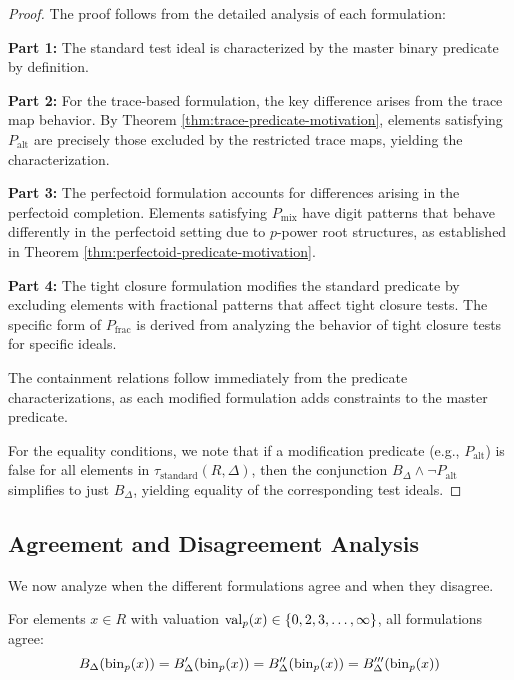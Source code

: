 \begin{proof}
The proof follows from the detailed analysis of each formulation:

\textbf{Part 1:} The standard test ideal is characterized by the master binary predicate by definition.

\textbf{Part 2:} For the trace-based formulation, the key difference arises from the trace map behavior. By Theorem \ref{thm:trace-predicate-motivation}, elements satisfying $P_{\text{alt}}$ are precisely those excluded by the restricted trace maps, yielding the characterization.

\textbf{Part 3:} The perfectoid formulation accounts for differences arising in the perfectoid completion. Elements satisfying $P_{\text{mix}}$ have digit patterns that behave differently in the perfectoid setting due to $p$-power root structures, as established in Theorem \ref{thm:perfectoid-predicate-motivation}.

\textbf{Part 4:} The tight closure formulation modifies the standard predicate by excluding elements with fractional patterns that affect tight closure tests. The specific form of $P_{\text{frac}}$ is derived from analyzing the behavior of tight closure tests for specific ideals.

The containment relations follow immediately from the predicate characterizations, as each modified formulation adds constraints to the master predicate.

For the equality conditions, we note that if a modification predicate (e.g., $P_{\text{alt}}$) is false for all elements in $\tau_{\text{standard}}(R,\Delta)$, then the conjunction $B_\Delta \wedge \neg P_{\text{alt}}$ simplifies to just $B_\Delta$, yielding equality of the corresponding test ideals.
\end{proof}

\subsection{Agreement and Disagreement Analysis}

We now analyze when the different formulations agree and when they disagree.

\begin{lemma}\label{lem:agreement-conditions}
For elements $x \in R$ with valuation $\operatorname{val}_p(x) \in \{0,2,3,\ldots,\infty\}$, all formulations agree:
$$B_\Delta(\operatorname{bin}_p(x)) = B'_\Delta(\operatorname{bin}_p(x)) = B''_\Delta(\operatorname{bin}_p(x)) = B'''_\Delta(\operatorname{bin}_p(x))$$
\end{lemma}

